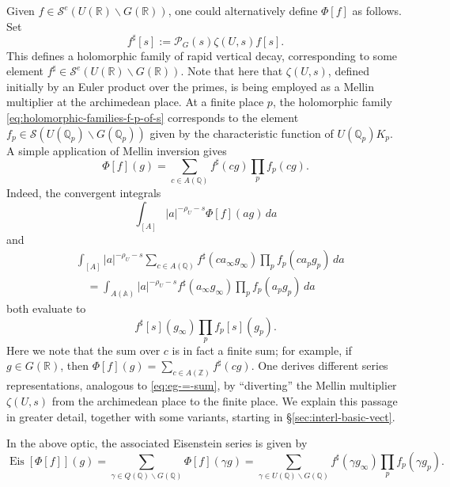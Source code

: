 \documentclass[reqno]{amsart}
\DeclareMathOperator{\Eis}{Eis}
\theoremstyle{plain} \newtheorem{theorem} {Theorem}
\theoremstyle{definition} \newtheorem{definition} [theorem] {Definition}
\theoremstyle{itplain} %
\numberwithin{equation}{section}
\numberwithin{theorem}{section}
\begin{document}
\begin{remark}\label{rmk:one-could-altern}
  Given $f \in \mathcal{S}^e(U(\mathbb{R}) \backslash G(\mathbb{R}))$, one could alternatively define $\Phi[f]$ as follows.  Set
  \begin{equation*}
f ^\sharp [s] := \mathcal{P}_G(s) \zeta(U,s) f[s].
\end{equation*}
  This defines a holomorphic family of rapid vertical decay, corresponding to some element $f ^\sharp \in \mathcal{S}^e(U(\mathbb{R}) \backslash G(\mathbb{R}))$.  Note that here that $\zeta(U,s)$, defined initially by an Euler product over the primes, is being employed as a Mellin multiplier at the archimedean place.  At a finite place $p$, the holomorphic family \eqref{eq:holomorphic-families-f-p-of-s} corresponds to the element $f_p \in \mathcal{S}(U(\mathbb{Q}_p) \backslash G(\mathbb{Q}_p))$ given by the characteristic function of $U(\mathbb{Q}_p) K_p$.  A simple application of Mellin inversion gives
  \begin{equation*}
    \Phi[f](g) = \sum _{c \in A(\mathbb{Q})} f ^\sharp (c g) \prod_p f_p(c g).
  \end{equation*}
  Indeed, the convergent integrals
  \begin{equation*}
    \int _{[A]} |a|^{-\rho_U - s}\Phi[f](a g)  \, d a
  \end{equation*}
  and
  \begin{align*}
    &\int _{[A]} |a|^{-\rho_U - s}\sum _{c \in A(\mathbb{Q})} f ^\sharp (c a_\infty  g_\infty ) \prod_p f _p (c a_p g_p) \, d a \\
    &\quad =
    \int _{A(\mathbb{A}) } |a|^{-\rho_U - s} f ^\sharp (a_\infty  g_\infty ) \prod _p f _p (a_p g_p) \, d a
  \end{align*}
both evaluate to
  \begin{equation*}
    f ^\sharp [s] (g _\infty ) \prod _p f _p [s] (g _p).
  \end{equation*}
  Here we note that the sum over $c$ is in fact a finite sum; for example, if $g \in G(\mathbb{R})$, then $\Phi[f](g) = \sum _{c \in A(\mathbb{Z})} f ^\sharp (c g)$.  One derives different series representations, analogous to \eqref{eq:eg-=-sum}, by ``diverting'' the Mellin multiplier $\zeta(U,s)$ from the archimedean place to the finite place.  We explain this passage in greater detail, together with some variants, starting in \S\ref{sec:interl-basic-vect}.

  In the above optic, the associated Eisenstein series is given by
  \begin{equation}\label{eq:eisphif=-sum-_gamma}
    \Eis[\Phi[f]](g) = \sum _{\gamma \in Q(\mathbb{Q}) \backslash G(\mathbb{Q}) } \Phi[f](\gamma g)
    = \sum _{\gamma \in U(\mathbb{Q}) \backslash G(\mathbb{Q})} f ^\sharp (\gamma g_\infty ) \prod _p f _p (\gamma g_p).
  \end{equation}
\end{remark}
\end{document}
